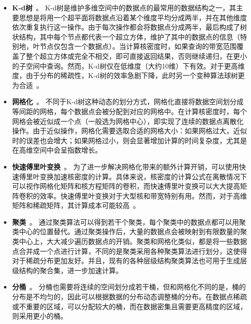 \begin{itemize}[leftmargin=*]
	\item \textbf{K-d树}~\cite{chan_efficient_2020, chan_quad_2020, chan_karl_2019}。 K-d树是维护多维空间中的数据点的最常用的数据结构之一，其主要思想是将用一个超平面将数据点沿着某个维度平均分成两半，并在其他维度依次重复执行这一操作。由于每次操作都会将数据点分成两半，最后构成了树状结构，其中每个节点都代表一个超立方体，维护了其中的数据点的信息（特别地，叶节点仅包含一个数据点）。当计算核密度时，如果查询的带宽范围覆盖了整个超立方体或完全不相交，即可直接返回结果，否则继续递归，在更小的子空间中查询。然而，K-d树仅在低维度（大约10维）下有效。对于更高维度，由于分布的稀疏性，K-d树的效率急剧下降，此时另一个变种算法球树更为合适~\cite{gray_nonparametric_2003}。
	
	\item \textbf{网格化}~\cite{hart_kernel_2014, black_highway_1991}。 不同于K-d树这种动态的划分方式，网格化直接将数据空间划分成等间距的网格，每个数据点会被分配到对应的网格中。在计算核密度时，每个网格会被近似成一个点（一般选为网格中心），即实现了连续的数据点离散化操作。由于近似操作，网格化需要选取合适的网格大小：如果网格过大，近似时的误差也会增大；如果网格过小，则会显著增加计算的时间复杂度，尤其是在高维空间中会呈指数增长。
	
	\item \textbf{快速傅里叶变换}~\cite{silverman_algorithm_1982, gramacki_nonparametric_2018}。 为了进一步解决网格化带来的额外计算开销，可以使用快速傅里叶变换加速核密度的计算。具体来说，核密度的计算公式在离散情况下可以视作网格化矩阵和核方程矩阵的卷积，而快速傅里叶变换可以大大提高矩阵卷积的效率。快速傅里叶变换对于大型核和带宽特别有用。然而，对于高维矩阵和稀疏矩阵，其计算成本可能较高~\cite{fan_fast_1994}。
	
	\item \textbf{聚类}~\cite{auber_interactive_2005, abello_ask-graphview_2006, hinneburg_denclue_2007}。 通过聚类算法可以得到若干个聚类，每个聚类中的数据点都可以用聚类中心的位置替代。通过聚类操作后，大量的数据点会被映射到有限数量的聚类中心上，大大减少遍历数据点的开销。聚类和网格化类似，都是将一些数据点合并成一个点进行计算，不同的是聚类采用各种聚类算法进行划分，这使得对于稀疏分布更加友好。并且，现有的各种层级结构聚类算法也可用于生成层级结构的聚合集，进一步加速计算。
	
	\item \textbf{分桶}~\cite{liu_immens_2013, gramacki_nonparametric_2018, li_interactive_2014}。 分桶也需要将连续的空间划分成若干桶，但和网格化不同的是，桶的分布是不均匀的，因此可以根据数据的分布动态调整桶的分布。在数据点稀疏或不重要的区域，可以分配较大的桶，而在数据密集且需要更高精度的区域，则采用更小的桶。
\end{itemize}

